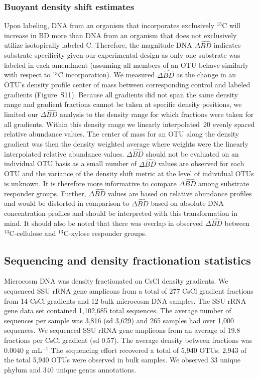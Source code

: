 \documentclass{article}
\begin{document}
\subsubsection{Buoyant density shift estimates}
Upon labeling, DNA from an organism that incorporates exclusively $^{13}$C will
increase in BD more than DNA from an organism that does not exclusively utilize
isotopically labeled C. Therefore, the magnitude DNA $\Delta\hat{BD}$ indicates
substrate specificity given our experimental design as only one substrate was
labeled in each amendment (assuming all members of an OTU behave similarly with
respect to $^{13}$C incorporation). We measured $\Delta\hat{BD}$ as the change in
an OTU's density profile center of mass between corresponding control and
labeled gradients (Figure~S11). Because all gradients did not span the same
density range and gradient fractions cannot be taken at specific density
positions, we limited our $\Delta\hat{BD}$ analysis to the density range for which
fractions were taken for all gradients. Within this density range we linearly
interpolated~20 evenly spaced relative abundance values. The center of mass for
an OTU along the density gradient was then the density weighted average where
weights were the linearly interpolated relative abundance values.
$\Delta\hat{BD}$ should not be evaluated on an individual OTU basis as a small
number of $\Delta\hat{BD}$ values are observed for each OTU and the variance of
the density shift metric at the level of individual OTUs is unknown. It is
therefore more informative to compare $\Delta\hat{BD}$ among substrate
responder groups. Further, $\Delta\hat{BD}$ values are based on relative
abundance profiles and would be distorted in comparison to $\Delta\hat{BD}$
based on absolute DNA concentration profiles and should be interpreted with
this transformation in mind. It should also be noted that there was overlap in
observed $\Delta\hat{BD}$ between $^{13}$C-cellulose and $^{13}$C-xylose
responder groups. 

\subsection{Sequencing and density fractionation statistics}\label{seq_stats}
Microcosm DNA was density fractionated on CsCl density gradients. We sequenced
SSU rRNA gene amplicons from a total of 277 CsCl gradient fractions from 14
CsCl gradients and 12 bulk microcosm DNA samples. The SSU rRNA gene data set
contained 1,102,685 total sequences. The average number of sequences per sample
was 3,816 (sd 3,629) and 265 samples had over 1,000 sequences. We sequenced SSU
rRNA gene amplicons from an average of 19.8 fractions per CsCl gradient (sd
0.57). The average density between fractions was  0.0040 g mL$^{-1}$ The
sequencing effort recovered a total of 5,940 OTUs. 2,943 of the total 5,940
OTUs were observed in bulk samples. We observed 33 unique phylum and 340 unique
genus annotations.


\end{document}
